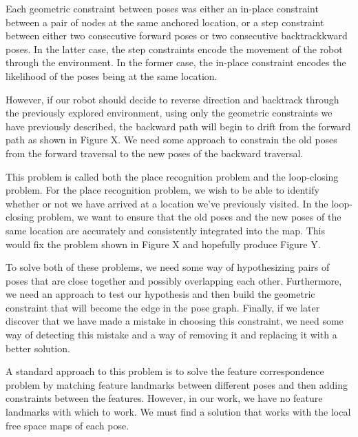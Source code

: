 Each geometric constraint between poses was either an in-place constraint between a pair of nodes at the same anchored location, or a step constraint between either two consecutive forward poses or two consecutive backtrackkward poses. In the latter case, the step constraints encode the movement of the robot through the environment. In the former case, the in-place constraint encodes the likelihood of the poses being at the same location.

However, if our robot should decide to reverse direction and backtrack through the previously explored environment, using only the geometric constraints we have previously described, the backward path will begin to drift from the forward path as shown in Figure X. We need some approach to constrain the old poses from the forward traversal to the new poses of the backward traversal.

This problem is called both the place recognition problem and the loop-closing problem. For the place recognition problem, we wish to be able to identify whether or not we have arrived at a location we've previously visited. In the loop-closing problem, we want to ensure that the old poses and the new poses of the same location are accurately and consistently integrated into the map. This would fix the problem shown in Figure X and hopefully produce Figure Y.

To solve both of these problems, we need some way of hypothesizing pairs of poses that are close together and possibly overlapping each other. Furthermore, we need an approach to test our hypothesis and then build the geometric constraint that will become the edge in the pose graph. Finally, if we later discover that we have made a mistake in choosing this constraint, we need some way of detecting this mistake and a way of removing it and replacing it with a better solution.

A standard approach to this problem is to solve the feature correspondence problem by matching feature landmarks between different poses and then adding constraints between the features. However, in our work, we have no feature landmarks with which to work. We must find a solution that works with the local free space maps of each pose.




